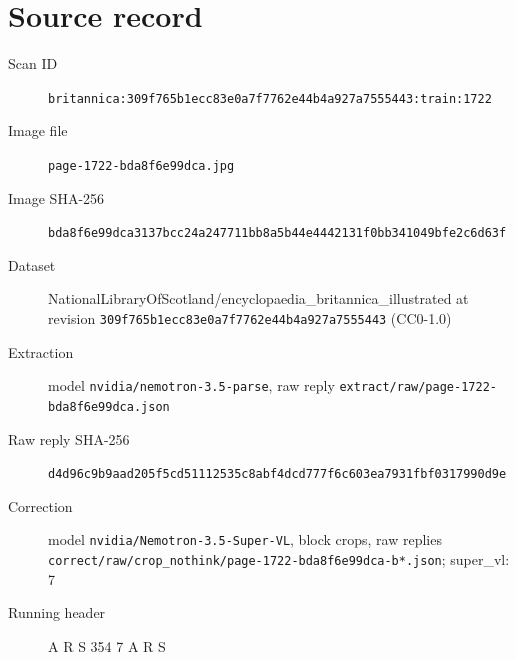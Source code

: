 \documentclass{article}
\begin{document}
\section*{Source record}
\begin{description}
\item[Scan ID] \texttt{britannica:309f765b1ecc83e0a7f7762e44b4a927a7555443:train:1722}
\item[Image file] \texttt{page-1722-bda8f6e99dca.jpg}
\item[Image SHA-256] \texttt{bda8f6e99dca3137bcc24a247711bb8a5b44e4442131f0bb341049bfe2c6d63f}
\item[Dataset] NationalLibraryOfScotland/encyclopaedia\_britannica\_illustrated at revision \texttt{309f765b1ecc83e0a7f7762e44b4a927a7555443} (CC0-1.0)
\item[Extraction] model \texttt{nvidia/nemotron-3.5-parse}, raw reply \texttt{extract/raw/page-1722-bda8f6e99dca.json}
\item[Raw reply SHA-256] \texttt{d4d96c9b9aad205f5cd51112535c8abf4dcd777f6c603ea7931fbf0317990d9e}
\item[Correction] model \texttt{nvidia/Nemotron-3.5-Super-VL}, block crops, raw replies \texttt{correct/raw/crop\_nothink/page-1722-bda8f6e99dca-b*.json}; super\_vl: 7
\item[Running header] A R S 354 7 A R S
\end{description}
\end{document}
